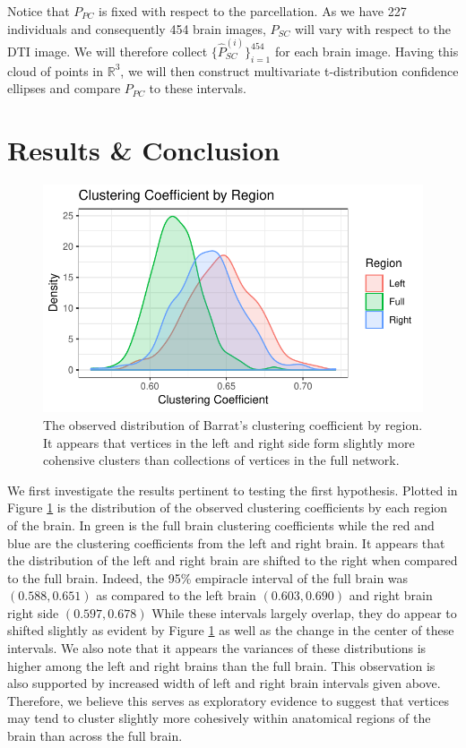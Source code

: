 \documentclass[01pt]{article}
\begin{document}
Notice that $P_{PC}$ is fixed with respect to the parcellation.
As we have 227 individuals and consequently 454 brain images, $P_{SC}$ will vary with respect to the DTI image. 
We will therefore collect $\{\hat{P}_{SC}^{(i)}\}_{i=1}^{454}$ for each brain image. 
Having this cloud of points in $\mathbb{R}^{3}$, we will then construct multivariate t-distribution confidence ellipses and compare $P_{PC}$ to these intervals. 


\section{Results \& Conclusion}

\begin{figure}
\begin{adjustwidth}{-.5in}{-.5in}
    \centering
    \includegraphics[width = .5\textwidth, height = .3\textwidth ]{figures/clustering_coef_region_comp.pdf}
    \caption{The observed distribution of Barrat's clustering coefficient by region. It appears that vertices in the left and right side form slightly more cohensive clusters than collections of vertices in the full network. }
    \label{fig:CC_by_region}
\end{adjustwidth}
\end{figure}

We first investigate the results pertinent to testing the first hypothesis. 
Plotted in Figure \ref{fig:CC_by_region} is the distribution of the observed clustering coefficients by each region of the brain. 
In green is the full brain clustering coefficients while the red and blue are the clustering coefficients from the left and right brain. 
It appears that the distribution of the left and right brain are shifted to the right when compared to the full brain. 
Indeed, the 95\% empiracle interval of the full brain was $(0.588, 0.651)$ as compared to the left brain $(0.603,0.690)$ and right brain right side $(0.597,0.678)$
While these intervals largely overlap, they do appear to shifted slightly as evident by Figure \ref{fig:CC_by_region} as well as the change in the center of these intervals. 
We also note that it appears the variances of these distributions is higher among the left and right brains than the full brain. 
This observation is also supported by increased width of left and right brain intervals given above. 
Therefore, we believe this serves as exploratory evidence to suggest that vertices may tend to cluster slightly more cohesively within anatomical regions of the brain than across the full brain. 
\end{document}
